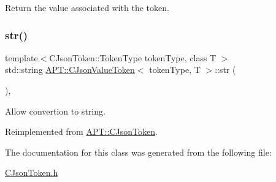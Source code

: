 Return the value associated with the token. \mbox{\label{classAPT_1_1CJsonValueToken_ab7d49b06f5242abfb7e67fa10278690b}} 
\subsubsection{\texorpdfstring{str()}{str()}}
{\footnotesize\ttfamily template$<$C\+Json\+Token\+::\+Token\+Type token\+Type, class T $>$ \\
std\+::string \hyperlink{classAPT_1_1CJsonValueToken}{A\+P\+T\+::\+C\+Json\+Value\+Token}$<$ token\+Type, T $>$\+::str (\begin{DoxyParamCaption}{ }\end{DoxyParamCaption})\hspace{0.3cm}{\ttfamily [inline]}, {\ttfamily [virtual]}}

Allow convertion to string. 

Reimplemented from \hyperlink{classAPT_1_1CJsonToken_a743343b64c20d0aa726d271c2b0e9be8}{A\+P\+T\+::\+C\+Json\+Token}.



The documentation for this class was generated from the following file\+:\begin{DoxyCompactItemize}
\item 
\hyperlink{CJsonToken_8h}{C\+Json\+Token.\+h}\end{DoxyCompactItemize}
